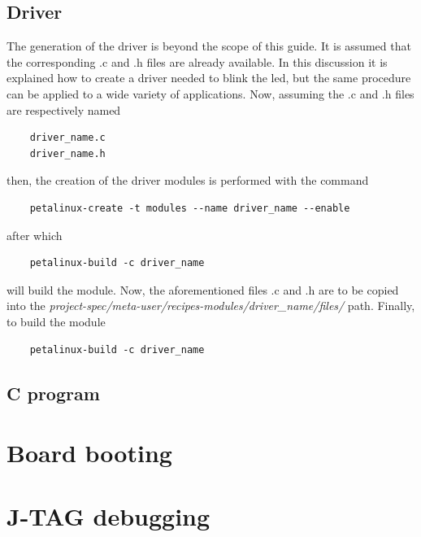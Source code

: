 \subsection{Driver}
The generation of the driver is beyond the scope of this guide. It is assumed that the corresponding .c and .h files are already available. In this discussion it is explained how to create a driver needed to blink the led, but the same procedure can be applied to a wide variety of applications. Now, assuming the .c and .h files are respectively named 
\begin{verbatim}
	driver_name.c
	driver_name.h
\end{verbatim}
then, the creation of the driver modules is performed with the command
\begin{verbatim}
	petalinux-create -t modules --name driver_name --enable
\end{verbatim}
after which 
\begin{verbatim}
	petalinux-build -c driver_name
\end{verbatim}
will build the module. Now, the aforementioned files .c and .h are to be copied into the \textit{project-spec/meta-user/recipes-modules/driver\_name/files/} path. Finally, to build the module
\begin{verbatim}
	petalinux-build -c driver_name
\end{verbatim}
\subsection{C program}

\section{Board booting}

\section{J-TAG debugging}

